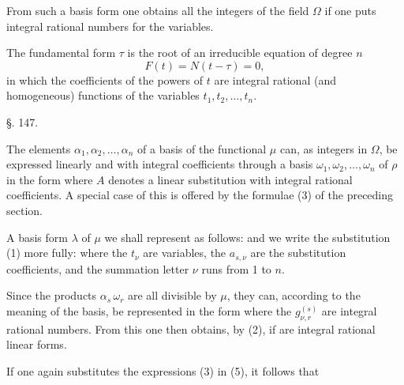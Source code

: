 
From such a basis form one obtains all the integers of the field
$\Omega$ if one puts integral rational numbers for the variables.

The fundamental form $\tau$ is the root of an irreducible equation
of degree $n$
\[
F(t) = N(t - \tau) = 0,
\]
in which the coefficients of the powers of $t$ are integral rational (and
homogeneous) functions of the variables $t_1, t_2, \ldots, t_n$.

\begin{center}
\S. 147.

\end{center}

The elements $\alpha_1, \alpha_2, \ldots, \alpha_n$ of a basis of the
functional $\mu$ can, as integers in $\Omega$, be expressed linearly
and with integral coefficients through a basis $\omega_1, \omega_2,
\ldots, \omega_n$ of $\rho$ in the form
where $A$ denotes a linear substitution with integral rational
coefficients. A special case of this is offered by the formulae
(3) of the preceding section.

A basis form $\lambda$ of $\mu$ we shall represent as follows:
and we write the substitution (1) more fully:
where the $t_\nu$ are variables, the $a_{s,\nu}$ are the substitution
coefficients, and the summation letter $\nu$ runs from 1 to $n$.

Since the products $\alpha_s\,\omega_r$ are all divisible by $\mu$, they
can, according to the meaning of the basis, be represented in the form
where the $g^{(s)}_{\nu,r}$ are integral rational numbers. From this one
then obtains, by (2),
if
are integral rational linear forms.

If one again substitutes the expressions (3) in (5), it follows that
